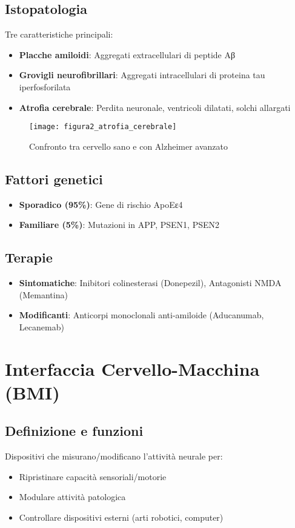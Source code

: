 \documentclass{article}
\begin{document}
\subsection{Istopatologia}
Tre caratteristiche principali:
\begin{itemize}
    \item \textbf{Placche amiloidi}: Aggregati extracellulari di peptide Aβ
    \item \textbf{Grovigli neurofibrillari}: Aggregati intracellulari di proteina tau iperfosforilata
    \item \textbf{Atrofia cerebrale}: Perdita neuronale, ventricoli dilatati, solchi allargati
\end{itemize}

\begin{figure}[h]
    \centering
    \texttt{[image: figura2\_atrofia\_cerebrale]}
    \caption{Confronto tra cervello sano e con Alzheimer avanzato}
    \label{fig:atrofia_cerebrale}
\end{figure}

\subsection{Fattori genetici}
\begin{itemize}
    \item \textbf{Sporadico (95\%)}: Gene di rischio ApoEε4
    \item \textbf{Familiare (5\%)}: Mutazioni in APP, PSEN1, PSEN2
\end{itemize}

\subsection{Terapie}
\begin{itemize}
    \item \textbf{Sintomatiche}: Inibitori colinesterasi (Donepezil), Antagonisti NMDA (Memantina)
    \item \textbf{Modificanti}: Anticorpi monoclonali anti-amiloide (Aducanumab, Lecanemab)
\end{itemize}

\section{Interfaccia Cervello-Macchina (BMI)}
\subsection{Definizione e funzioni}
Dispositivi che misurano/modificano l'attività neurale per:
\begin{itemize}
    \item Ripristinare capacità sensoriali/motorie
    \item Modulare attività patologica
    \item Controllare dispositivi esterni (arti robotici, computer)
\end{itemize}
\end{document}
